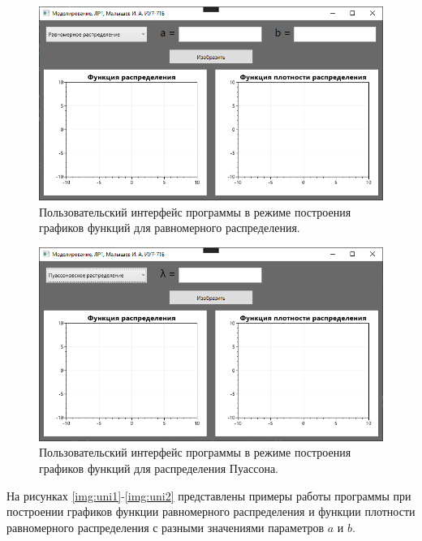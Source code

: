\documentclass[12pt]{report}
\begin{document}
\begin{figure}[H]
	\begin{center}
		\includegraphics[scale=0.6]{imgs/ui1.png}
	\end{center}
	\caption{Пользовательский интерфейс программы в режиме построения графиков функций для равномерного распределения.}
	\label{img:ui1}
\end{figure}

\begin{figure}[H]
	\begin{center}
		\includegraphics[scale=0.6]{imgs/ui2.png}
	\end{center}
	\caption{Пользовательский интерфейс программы в режиме построения графиков функций для распределения Пуассона.}
	\label{img:ui2}
\end{figure}

На рисунках \ref{img:uni1}-\ref{img:uni2} представлены примеры работы программы при построении графиков функции равномерного распределения и функции плотности равномерного распределения с разными значениями параметров $a$ и $b$.
\end{document}
